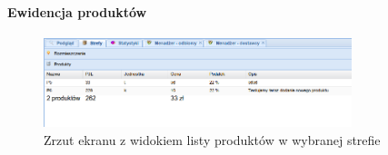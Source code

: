 		\paragraph{Ewidencja produktów}
		\begin{figure}[h]
			\centering
			\includegraphics[width=0.8\textwidth]{images/app/unit_products_preview}
			\caption[Aplikacja - Ewidencja towarów w poszczególnych strefach]{Zrzut ekranu z widokiem listy produktów w wybranej strefie}
			\label{c7:fig:app:unit_products_preview}
		\end{figure}